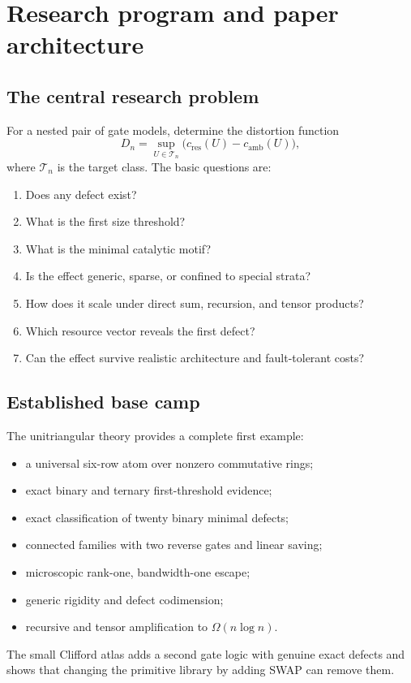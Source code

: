 \chapter{Research program and paper architecture}\label{ch:program}


\section{The central research problem}
For a nested pair of gate models, determine the distortion function
\[
D_n=
\sup_{U\in\mathcal T_n}
\bigl(c_{\mathrm{res}}(U)-c_{\mathrm{amb}}(U)\bigr),
\]
where $\mathcal T_n$ is the target class.  The basic questions are:
\begin{enumerate}
\item Does any defect exist?
\item What is the first size threshold?
\item What is the minimal catalytic motif?
\item Is the effect generic, sparse, or confined to special strata?
\item How does it scale under direct sum, recursion, and tensor products?
\item Which resource vector reveals the first defect?
\item Can the effect survive realistic architecture and fault-tolerant costs?
\end{enumerate}

\section{Established base camp}
The unitriangular theory provides a complete first example:
\begin{itemize}
\item a universal six-row atom over nonzero commutative rings;
\item exact binary and ternary first-threshold evidence;
\item exact classification of twenty binary minimal defects;
\item connected families with two reverse gates and linear saving;
\item microscopic rank-one, bandwidth-one escape;
\item generic rigidity and defect codimension;
\item recursive and tensor amplification to $\Omega(n\log n)$.
\end{itemize}
The small Clifford atlas adds a second gate logic with genuine exact defects and shows that changing the primitive library by adding SWAP can remove them.

